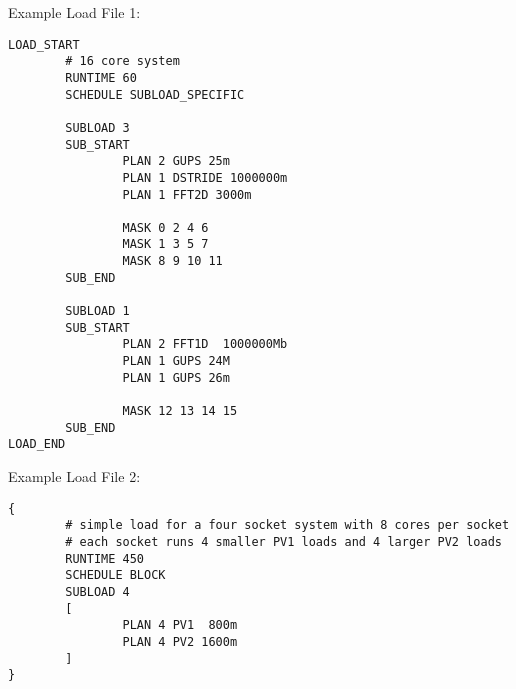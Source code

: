 Example Load File 1:
\begin{verbatim}
LOAD_START
        # 16 core system
        RUNTIME 60
        SCHEDULE SUBLOAD_SPECIFIC

        SUBLOAD 3
        SUB_START
                PLAN 2 GUPS 25m
                PLAN 1 DSTRIDE 1000000m
                PLAN 1 FFT2D 3000m

                MASK 0 2 4 6
                MASK 1 3 5 7
                MASK 8 9 10 11
        SUB_END

        SUBLOAD 1
        SUB_START
                PLAN 2 FFT1D  1000000Mb
                PLAN 1 GUPS 24M
                PLAN 1 GUPS 26m

                MASK 12 13 14 15
        SUB_END
LOAD_END
\end{verbatim}

Example Load File 2:
\begin{verbatim}
{
        # simple load for a four socket system with 8 cores per socket
        # each socket runs 4 smaller PV1 loads and 4 larger PV2 loads
        RUNTIME 450
        SCHEDULE BLOCK
        SUBLOAD 4
        [
                PLAN 4 PV1  800m
                PLAN 4 PV2 1600m
        ]
}
\end{verbatim}


